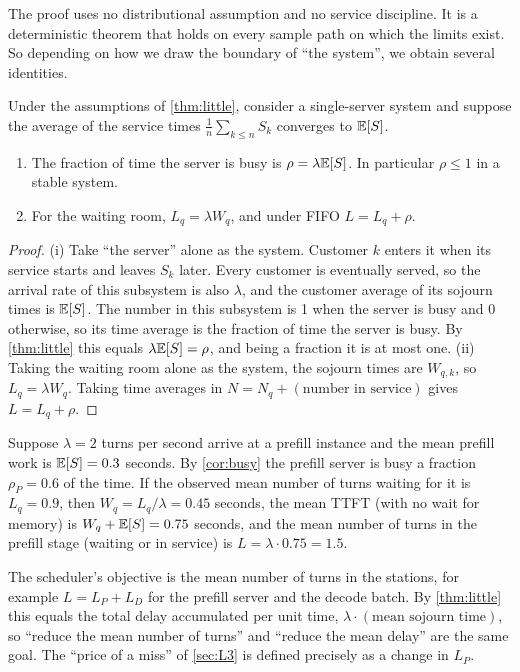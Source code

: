 The proof uses no distributional assumption and no service discipline. It is a
deterministic theorem that holds on every sample path on which the limits exist. So
depending on how we draw the boundary of ``the system'', we obtain several identities.

\begin{corollary}\label{cor:busy}
Under the assumptions of \cref{thm:little}, consider a single-server system and
suppose the average of the service times $\frac1n\sum_{k\le n}S_k$ converges to
$\mathbb{E}[S]$.
\begin{enumerate}[label=(\roman*)]
\item The fraction of time the server is busy is $\rho=\lambda\mathbb{E}[S]$. In particular
  $\rho\le1$ in a stable system.
\item For the waiting room, $L_q=\lambda W_q$, and under FIFO $L=L_q+\rho$.
\end{enumerate}
\end{corollary}

\begin{proof}
(i) Take ``the server'' alone as the system. Customer $k$ enters it when its service
starts and leaves $S_k$ later. Every customer is eventually served, so the arrival
rate of this subsystem is also $\lambda$, and the customer average of its sojourn times
is $\mathbb{E}[S]$. The number in this subsystem is 1 when the server is busy and 0 otherwise,
so its time average is the fraction of time the server is busy. By \cref{thm:little}
this equals $\lambda\mathbb{E}[S]=\rho$, and being a fraction it is at most one.
(ii) Taking the waiting room alone as the system, the sojourn times are $W_{q,k}$, so
$L_q=\lambda W_q$. Taking time averages in $N=N_q+(\text{number in service})$ gives
$L=L_q+\rho$.
\end{proof}

\begin{example}\label{L1:ex:little}
Suppose $\lambda=2$ turns per second arrive at a prefill instance and the mean prefill
work is $\mathbb{E}[S]=0.3$ seconds. By \cref{cor:busy} the prefill server is busy a fraction
$\rho_P=0.6$ of the time. If the observed mean number of turns waiting for it is
$L_q=0.9$, then $W_q=L_q/\lambda=0.45$ seconds, the mean TTFT (with no wait for memory)
is $W_q+\mathbb{E}[S]=0.75$ seconds, and the mean number of turns in the prefill stage (waiting or in service) is
$L=\lambda\cdot0.75=1.5$.
\end{example}

The scheduler's objective is the mean number of turns in the stations, for example
$L=L_P+L_D$ for the prefill server and the decode batch. By \cref{thm:little} this
equals the total delay accumulated per unit time, $\lambda\cdot(\text{mean sojourn
time})$, so ``reduce the mean number of turns'' and ``reduce the mean delay'' are the
same goal. The ``price of a miss'' of \cref{sec:L3} is defined precisely as a change in
$L_P$.

